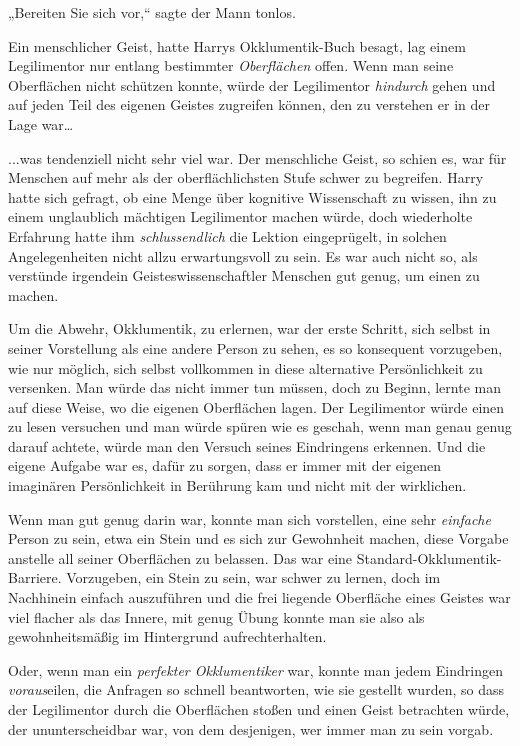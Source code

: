 {„Bereiten Sie sich vor,“ sagte der Mann tonlos.

Ein menschlicher Geist, hatte Harrys Okklumentik-Buch besagt, lag einem Legilimentor nur entlang bestimmter \emph{Oberflächen} offen. Wenn man seine Oberflächen nicht schützen konnte, würde der Legilimentor \emph{hindurch} gehen und auf jeden Teil des eigenen Geistes zugreifen können, den zu verstehen er in der Lage war…

...was tendenziell nicht sehr viel war. Der menschliche Geist, so schien es, war für Menschen auf mehr als der oberflächlichsten Stufe schwer zu begreifen. Harry hatte sich gefragt, ob eine Menge über kognitive Wissenschaft zu wissen, ihn zu einem unglaublich mächtigen Legilimentor machen würde, doch wiederholte Erfahrung hatte ihm \emph{schlussendlich} die Lektion eingeprügelt, in solchen Angelegenheiten nicht allzu erwartungsvoll zu sein. Es war auch nicht so, als verstünde irgendein Geisteswissenschaftler Menschen gut genug, um einen zu machen.

Um die Abwehr, Okklumentik, zu erlernen, war der erste Schritt, sich selbst in seiner Vorstellung als eine andere Person zu sehen, es so konsequent vorzugeben, wie nur möglich, sich selbst vollkommen in diese alternative Persönlichkeit zu versenken. Man würde das nicht immer tun müssen, doch zu Beginn, lernte man auf diese Weise, wo die eigenen Oberflächen lagen. Der Legilimentor würde einen zu lesen versuchen und man würde spüren wie es geschah, wenn man genau genug darauf achtete, würde man den Versuch seines Eindringens erkennen. Und die eigene Aufgabe war es, dafür zu sorgen, dass er immer mit der eigenen imaginären Persönlichkeit in Berührung kam und nicht mit der wirklichen.

Wenn man gut genug darin war, konnte man sich vorstellen, eine sehr \emph{einfache} Person zu sein, etwa ein Stein und es sich zur Gewohnheit machen, diese Vorgabe anstelle all seiner Oberflächen zu belassen. Das war eine Standard-Okklumentik-Barriere. Vorzugeben, ein Stein zu sein, war schwer zu lernen, doch im Nachhinein einfach auszuführen und die frei liegende Oberfläche eines Geistes war viel flacher als das Innere, mit genug Übung konnte man sie also als gewohnheitsmäßig im Hintergrund aufrechterhalten.

Oder, wenn man ein \emph{perfekter Okklumentiker} war, konnte man jedem Eindringen \emph{voraus}eilen, die Anfragen so schnell beantworten, wie sie gestellt wurden, so dass der Legilimentor durch die Oberflächen stoßen und einen Geist betrachten würde, der ununterscheidbar war, von dem desjenigen, wer immer man zu sein vorgab.

}
